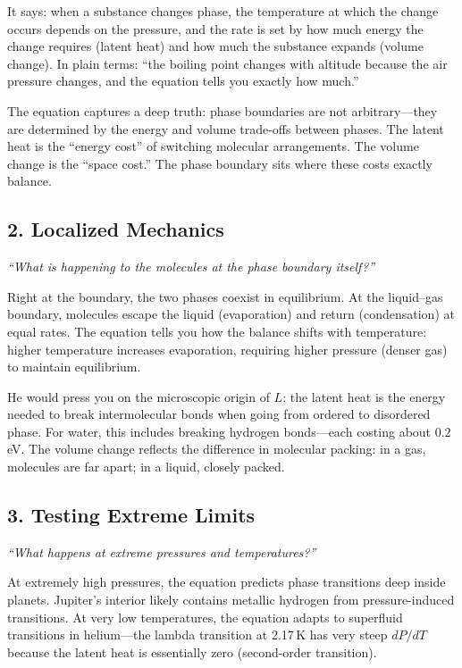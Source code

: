 It says: when a substance changes phase, the temperature at which the change occurs depends on the pressure, and the rate is set by how much energy the change requires (latent heat) and how much the substance expands (volume change). In plain terms: ``the boiling point changes with altitude because the air pressure changes, and the equation tells you exactly how much.''

The equation captures a deep truth: phase boundaries are not arbitrary---they are determined by the energy and volume trade-offs between phases. The latent heat is the ``energy cost'' of switching molecular arrangements. The volume change is the ``space cost.'' The phase boundary sits where these costs exactly balance.

\subsection*{2. Localized Mechanics}
\textit{``What is happening to the molecules at the phase boundary itself?''}

Right at the boundary, the two phases coexist in equilibrium. At the liquid--gas boundary, molecules escape the liquid (evaporation) and return (condensation) at equal rates. The equation tells you how the balance shifts with temperature: higher temperature increases evaporation, requiring higher pressure (denser gas) to maintain equilibrium.

He would press you on the microscopic origin of $L$: the latent heat is the energy needed to break intermolecular bonds when going from ordered to disordered phase. For water, this includes breaking hydrogen bonds---each costing about $0.2$\,eV. The volume change reflects the difference in molecular packing: in a gas, molecules are far apart; in a liquid, closely packed.

\subsection*{3. Testing Extreme Limits}
\textit{``What happens at extreme pressures and temperatures?''}

At extremely high pressures, the equation predicts phase transitions deep inside planets. Jupiter's interior likely contains metallic hydrogen from pressure-induced transitions. At very low temperatures, the equation adapts to superfluid transitions in helium---the lambda transition at 2.17\,K has very steep $dP/dT$ because the latent heat is essentially zero (second-order transition).

